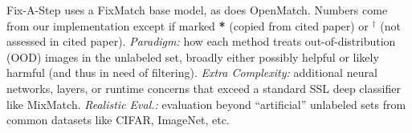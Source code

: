 \begin{table}[!t]
{Fix-A-Step uses a FixMatch base model, as does OpenMatch.
Numbers come from our implementation except if marked \textbf{*} (copied from cited paper) or $^\dagger$ (not assessed in cited paper).
\emph{Paradigm:} how each method treats out-of-distribution (OOD) images in the unlabeled set, broadly either possibly helpful or likely harmful (and thus in need of filtering).
\emph{Extra Complexity:} additional neural networks, layers, or runtime concerns that exceed a standard SSL deep classifier like MixMatch.
\emph{Realistic Eval.:} evaluation beyond ``artificial'' unlabeled sets from common datasets like CIFAR, ImageNet, etc.
}%
\vspace{-0.1cm}
\label{tab:related_work_comparison}
\end{table}
